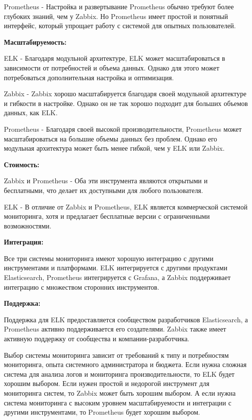Prometheus - Настройка и развертывание Prometheus обычно требуют более глубоких знаний, чем у Zabbix.
Но Prometheus имеет простой и понятный интерфейс, который упрощает работу с системой для опытных пользователей.

\textbf{Масштабируемость:}

ELK - Благодаря модульной архитектуре, ELK может масштабироваться в зависимости от потребностей и объема данных.
Однако для этого может потребоваться дополнительная настройка и оптимизация.

Zabbix - Zabbix хорошо масштабируется благодаря своей модульной архитектуре и гибкости в настройке.
Однако он не так хорошо подходит для больших объемов данных, как ELK.

Prometheus - Благодаря своей высокой производительности, Prometheus может масштабироваться на большие объемы
данных без проблем. Однако его модульная архитектура может быть менее гибкой, чем у ELK или Zabbix.

\textbf{Стоимость:}

Zabbix и Prometheus - Оба эти инструмента являются открытыми и бесплатными, что делает их доступными для любого пользователя.

ELK - В отличие от Zabbix и Prometheus, ELK является коммерческой системой мониторинга, хотя и предлагает
бесплатные версии с ограниченными возможностями.

\textbf{Интеграция:}

Все три системы мониторинга имеют хорошую интеграцию с другими инструментами и платформами.
ELK интегрируется с другими продуктами Elasticsearch, Prometheus интегрируется с Grafana, а Zabbix
поддерживает интеграцию с множеством сторонних инструментов.

\textbf{Поддержка:}

Поддержка для ELK предоставляется сообществом разработчиков Elasticsearch, а Prometheus активно поддерживается его создателями.
Zabbix также имеет активную поддержку от сообщества и компании-разработчика.

Выбор системы мониторинга зависит от требований к типу и потребностям мониторинга, опыта системного администратора и бюджета.
Если нужна сложная система для анализа логов и мониторинга производительности, то ELK будет хорошим выбором.
Если нужен простой и недорогой инструмент для мониторинга систем, то Zabbix может быть хорошим выбором.
А если нужна система мониторинга с высоким уровнем масштабируемости и интеграции с другими инструментами,
то Prometheus будет хорошим выбором.

